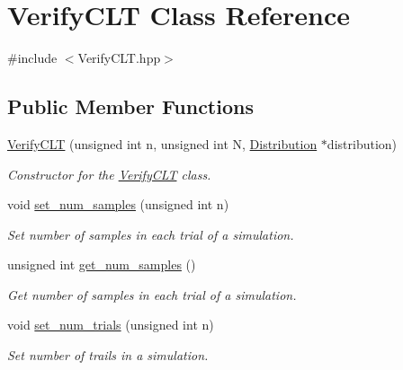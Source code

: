 \hypertarget{classVerifyCLT}{}\section{Verify\+C\+LT Class Reference}
\label{classVerifyCLT}


{\ttfamily \#include $<$Verify\+C\+L\+T.\+hpp$>$}

\subsection*{Public Member Functions}
\begin{DoxyCompactItemize}
\item 
\mbox{\label{classVerifyCLT_ad4e2026100895b40cb4080f69d05bca5}} 
\hyperlink{classVerifyCLT_ad4e2026100895b40cb4080f69d05bca5}{Verify\+C\+LT} (unsigned int n, unsigned int N, \hyperlink{classDistribution}{Distribution} $\ast$distribution)
\begin{DoxyCompactList}\small\item\em Constructor for the \hyperlink{classVerifyCLT}{Verify\+C\+LT} class. \end{DoxyCompactList}\item 
\mbox{\label{classVerifyCLT_a74962a451a269dbd1f3d1abb2f1679bd}} 
void \hyperlink{classVerifyCLT_a74962a451a269dbd1f3d1abb2f1679bd}{set\+\_\+num\+\_\+samples} (unsigned int n)
\begin{DoxyCompactList}\small\item\em Set number of samples in each trial of a simulation. \end{DoxyCompactList}\item 
\mbox{\label{classVerifyCLT_ae77c9476c98ac8a245b3cfa3162141a5}} 
unsigned int \hyperlink{classVerifyCLT_ae77c9476c98ac8a245b3cfa3162141a5}{get\+\_\+num\+\_\+samples} ()
\begin{DoxyCompactList}\small\item\em Get number of samples in each trial of a simulation. \end{DoxyCompactList}\item 
\mbox{\label{classVerifyCLT_a7c1700ed3e4ad9a9a4b778bb8dc5d800}} 
void \hyperlink{classVerifyCLT_a7c1700ed3e4ad9a9a4b778bb8dc5d800}{set\+\_\+num\+\_\+trials} (unsigned int n)
\begin{DoxyCompactList}\small\item\em Set number of trails in a simulation. \end{DoxyCompactList}\item 

\end{DoxyCompactItemize}
